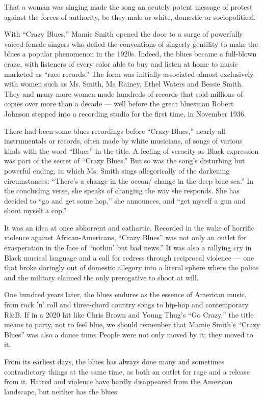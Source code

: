 That a woman was singing made the song an acutely potent message of
protest against the forces of authority, be they male or white, domestic
or sociopolitical.

With ``Crazy Blues,'' Mamie Smith opened the door to a surge of
powerfully voiced female singers who defied the conventions of singerly
gentility to make the blues a popular phenomenon in the 1920s. Indeed,
the blues became a full-blown craze, with listeners of every color able
to buy and listen at home to music marketed as ``race records.'' The
form was initially associated almost exclusively with women such as Ms.
Smith, Ma Rainey, Ethel Waters and Bessie Smith. They and many more
women made hundreds of records that sold millions of copies over more
than a decade --- well before the great bluesman Robert Johnson stepped
into a recording studio for the first time, in November 1936.

There had been some blues recordings before ``Crazy Blues,'' nearly all
instrumentals or records, often made by white musicians, of songs of
various kinds with the word ``Blues'' in the title. A feeling of
veracity as Black expression was part of the secret of ``Crazy Blues.''
But so was the song's disturbing but powerful ending, in which Ms. Smith
sings allegorically of the darkening circumstances: ``There's a change
in the ocean/ change in the deep blue sea.'' In the concluding verse,
she speaks of changing the way she responds. She has decided to ``go and
get some hop,'' she announces, and ``get myself a gun and shoot myself a
cop.''

It was an idea at once abhorrent and cathartic. Recorded in the wake of
horrific violence against African-Americans, ``Crazy Blues'' was not
only an outlet for exasperation in the face of ``nothin' but bad news.''
It was also a rallying cry in Black musical language and a call for
redress through reciprocal violence --- one that broke daringly out of
domestic allegory into a literal sphere where the police and the
military claimed the only prerogative to shoot at will.

One hundred years later, the blues endures as the essence of American
music, from rock 'n' roll and three-chord country songs to hip-hop and
contemporary R\&B. If in a 2020 hit like Chris Brown and Young Thug's
``Go Crazy,'' the title means to party, not to feel blue, we should
remember that Mamie Smith's ``Crazy Blues'' was also a dance tune:
People were not only moved by it; they moved to it.

From its earliest days, the blues has always done many and sometimes
contradictory things at the same time, as both an outlet for rage and a
release from it. Hatred and violence have hardly disappeared from the
American landscape, but neither has the blues.


